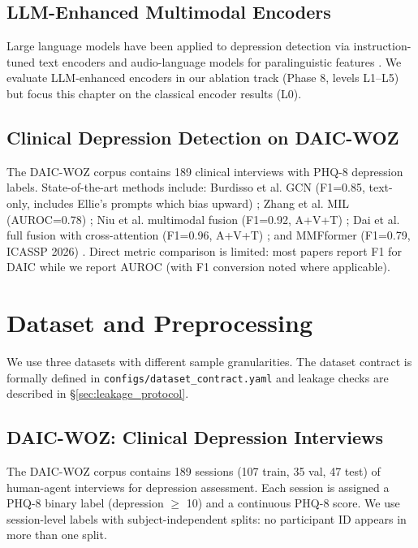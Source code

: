 \documentclass[12pt,oneside]{book}
\begin{document}
\subsection{LLM-Enhanced Multimodal Encoders}

Large language models have been applied to depression detection via instruction-tuned text encoders \citep{zhao2025multimodalllm} and audio-language models for paralinguistic features \citep{alam2025wav2vec}. We evaluate LLM-enhanced encoders in our ablation track (Phase 8, levels L1--L5) but focus this chapter on the classical encoder results (L0).

\subsection{Clinical Depression Detection on DAIC-WOZ}

The DAIC-WOZ corpus \citep{gratch2014distress} contains 189 clinical interviews with PHQ-8 depression labels. State-of-the-art methods include: Burdisso et al. GCN (F1=0.85, text-only, includes Ellie's prompts which bias upward) \citep{burdisso2024gcndp}; Zhang et al. MIL (AUROC=0.78) \citep{zhang2025mil}; Niu et al. multimodal fusion (F1=0.92, A+V+T) \citep{niu2021multimodal}; Dai et al. full fusion with cross-attention (F1=0.96, A+V+T) \citep{dai2021fullfusion}; and MMFformer (F1=0.79, ICASSP 2026) \citep{zhang2026mmfformer}. Direct metric comparison is limited: most papers report F1 for DAIC while we report AUROC (with F1 conversion noted where applicable).

\section{Dataset and Preprocessing}
\label{sec:dataset}

We use three datasets with different sample granularities. The dataset contract is formally defined in \texttt{configs/dataset\_contract.yaml} and leakage checks are described in \S\ref{sec:leakage_protocol}.

\subsection{DAIC-WOZ: Clinical Depression Interviews}
\label{sec:daic}

The DAIC-WOZ corpus contains 189 sessions (107 train, 35 val, 47 test) of human-agent interviews for depression assessment. Each session is assigned a PHQ-8 binary label (depression $\ge$ 10) and a continuous PHQ-8 score. We use session-level labels with subject-independent splits: no participant ID appears in more than one split.
\end{document}
